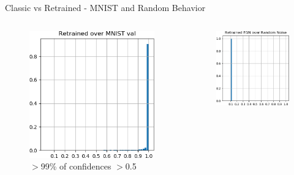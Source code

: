 \documentclass{beamer}
\begin{document}
\begin{frame}{Classic vs Retrained - MNIST and Random Behavior}
    \vspace{-2mm}
    \begin{columns}
    \begin{column}{.33\textwidth}
    \begin{figure}
        \includegraphics[width=.85\textwidth]{images/mnist-behavior/retrained-hist-val.png}
        \centering \tiny{$>$99\% of confidences $>$0.5}
    \end{figure}
    \end{column}
    \begin{column}{.33\textwidth}
    \begin{figure}
        \includegraphics[width=.85\textwidth]{images/mnist-behavior/retrained-hist-random.png}\\

\end{figure}
\end{column}
\end{columns}
\end{frame}
\end{document}
